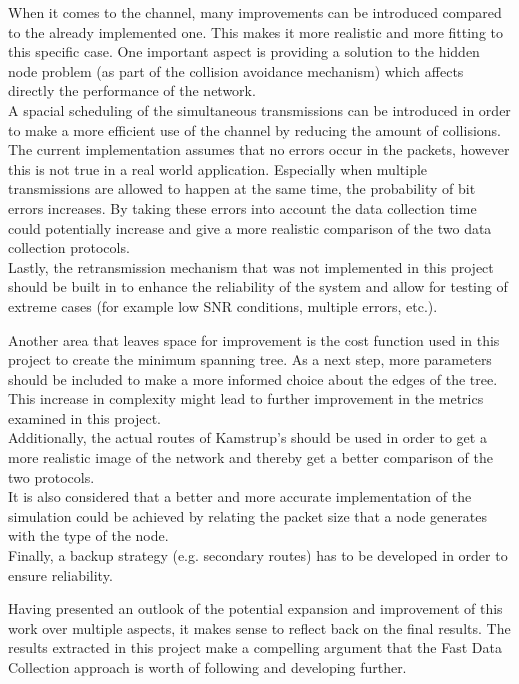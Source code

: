 When it comes to the channel, many improvements can be introduced compared to the already implemented one. This makes it more realistic and more fitting to this specific case. One important aspect is providing a solution to the hidden node problem (as part of the collision avoidance mechanism) which affects directly the performance of the network.\\
A spacial scheduling of the simultaneous transmissions can be introduced in order to make a more efficient use of the channel by reducing the amount of collisions.\\
The current implementation assumes that no errors occur in the packets, however this is not true in a real world application. Especially when multiple transmissions are allowed to happen at the same time, the probability of bit errors increases. By taking these errors into account the data collection time could potentially increase and give a more realistic comparison of the two data collection protocols.\\
Lastly, the retransmission mechanism that was not implemented in this project should be built in to enhance the reliability of the system and allow for testing of extreme cases (for example low SNR conditions, multiple errors, etc.).

Another area that leaves space for improvement is the cost function used in this project to create the minimum spanning tree. As a next step, more parameters should be included to make a more informed choice about the edges of the tree. This increase in complexity might lead to further improvement in the metrics examined in this project.\\
Additionally, the actual routes of Kamstrup's should be used in order to get a more realistic image of the network and thereby get a better comparison of the two protocols.\\
It is also considered that a better and more accurate implementation of the simulation could be achieved by relating the packet size that a node generates with the type of the node.\\
Finally, a backup strategy (e.g. secondary routes) has to be developed in order to ensure reliability.

Having presented an outlook of the potential expansion and improvement of this work over multiple aspects, it makes sense to reflect back on the final results. The results extracted in this project make a compelling argument that the Fast Data Collection approach is worth of following and developing further.
